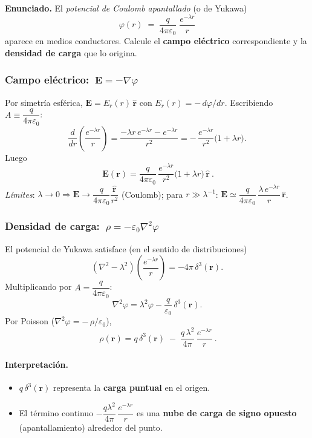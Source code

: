 \documentclass{article}
\begin{document}
\textbf{Enunciado.} El \emph{potencial de Coulomb apantallado} (o de Yukawa)
\[
\varphi(r)\;=\;\frac{q}{4\pi\varepsilon_{0}}\;\frac{e^{-\lambda r}}{r}
\]
aparece en medios conductores. Calcule el \textbf{campo eléctrico} correspondiente y la \textbf{densidad de carga} que lo origina.

\subsubsection*{Campo eléctrico: $\ \mathbf E=-\nabla\varphi$}
Por simetría esférica, $\mathbf E=E_r(r)\,\hat{\mathbf r}$ con $E_r(r)=-\,d\varphi/dr$. Escribiendo $A\equiv \dfrac{q}{4\pi\varepsilon_0}$:
\[
\frac{d}{dr}\!\left(\frac{e^{-\lambda r}}{r}\right)
=\frac{-\lambda r\,e^{-\lambda r}-e^{-\lambda r}}{r^{2}}
=-\,\frac{e^{-\lambda r}}{r^{2}}\big(1+\lambda r\big).
\]
Luego
\[
\boxed{\ \mathbf E(\mathbf r)=\frac{q}{4\pi\varepsilon_0}\,\frac{e^{-\lambda r}}{r^{2}}\big(1+\lambda r\big)\,\hat{\mathbf r}\ }.
\]
\emph{Límites}: $\lambda\!\to\!0\Rightarrow \mathbf E\to \dfrac{q}{4\pi\varepsilon_0}\dfrac{\hat{\mathbf r}}{r^{2}}$ (Coulomb);
para $r\gg \lambda^{-1}$: $\mathbf E\simeq \dfrac{q}{4\pi\varepsilon_0}\,\dfrac{\lambda\,e^{-\lambda r}}{r}\,\hat{\mathbf r}$.

\subsubsection*{Densidad de carga: $\ \rho=-\varepsilon_0\nabla^2\varphi$}
El potencial de Yukawa satisface (en el sentido de distribuciones)
\[
(\nabla^{2}-\lambda^{2})\!\left(\frac{e^{-\lambda r}}{r}\right)=-4\pi\,\delta^{3}(\mathbf r).
\]
Multiplicando por $A=\dfrac{q}{4\pi\varepsilon_0}$:
\[
\nabla^{2}\varphi=\lambda^{2}\varphi-\frac{q}{\varepsilon_0}\,\delta^{3}(\mathbf r).
\]
Por Poisson ($\nabla^{2}\varphi=-\,\rho/\varepsilon_0$),
\[
\boxed{\ \rho(\mathbf r)=q\,\delta^{3}(\mathbf r)\;-\;\frac{q\,\lambda^{2}}{4\pi}\,\frac{e^{-\lambda r}}{r}\ }.
\]

\paragraph{Interpretación.}
\begin{itemize}
\item $q\,\delta^{3}(\mathbf r)$ representa la \textbf{carga puntual} en el origen.
\item El término continuo $-\dfrac{q\lambda^{2}}{4\pi}\,\dfrac{e^{-\lambda r}}{r}$ es una \textbf{nube de carga de signo opuesto} (apantallamiento) alrededor del punto.
\end{itemize}
\end{document}
